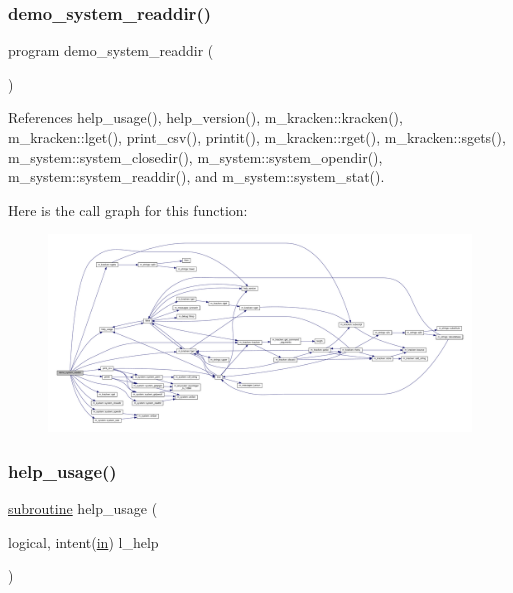 \subsubsection{\texorpdfstring{demo\+\_\+system\+\_\+readdir()}{demo\_system\_readdir()}}
{\footnotesize\ttfamily program demo\+\_\+system\+\_\+readdir (\begin{DoxyParamCaption}{ }\end{DoxyParamCaption})}



References help\+\_\+usage(), help\+\_\+version(), m\+\_\+kracken\+::kracken(), m\+\_\+kracken\+::lget(), print\+\_\+csv(), printit(), m\+\_\+kracken\+::rget(), m\+\_\+kracken\+::sgets(), m\+\_\+system\+::system\+\_\+closedir(), m\+\_\+system\+::system\+\_\+opendir(), m\+\_\+system\+::system\+\_\+readdir(), and m\+\_\+system\+::system\+\_\+stat().

Here is the call graph for this function\+:
\nopagebreak
\begin{figure}[H]
\begin{center}
\leavevmode
\includegraphics[width=350pt]{__ls_8f90_a88c164012f5d1153e039f2dcaa76e971_cgraph}
\end{center}
\end{figure}
\mbox{\label{__ls_8f90_a3e09a3b52ee8fb04eeb93fe5761626a8}} 
\subsubsection{\texorpdfstring{help\+\_\+usage()}{help\_usage()}}
{\footnotesize\ttfamily \hyperlink{M__stopwatch_83_8txt_acfbcff50169d691ff02d4a123ed70482}{subroutine} help\+\_\+usage (\begin{DoxyParamCaption}\item[{logical, intent(\hyperlink{M__journal_83_8txt_afce72651d1eed785a2132bee863b2f38}{in})}]{l\+\_\+help }\end{DoxyParamCaption})}



